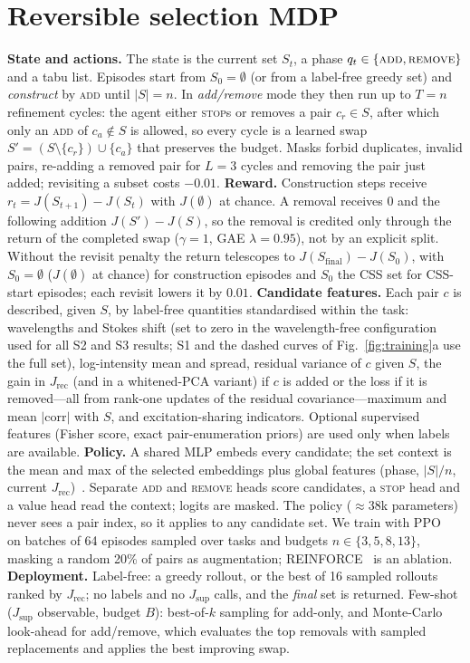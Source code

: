\documentclass[conference]{IEEEtran}
\newcommand{\JS}{J_{\mathrm{sup}}}
\newcommand{\JR}{J_{\mathrm{rec}}}
\newcommand{\add}{\textsc{add}}
\newcommand{\rem}{\textsc{remove}}
\newcommand{\stp}{\textsc{stop}}
\begin{document}
\section{Reversible selection MDP}
\textbf{State and actions.} The state is the current set $S_t$, a phase $q_t\in\{\add,\rem\}$ and a tabu list. Episodes start from $S_0=\emptyset$ (or from a label-free greedy set) and \emph{construct} by \add{} until $|S|=n$. In \emph{add/remove} mode they then run up to $T=n$ refinement cycles: the agent either \stp{}s or removes a pair $c_r\in S$, after which only an \add{} of $c_a\notin S$ is allowed, so every cycle is a learned swap $S'=(S\setminus\{c_r\})\cup\{c_a\}$ that preserves the budget. Masks forbid duplicates, invalid pairs, re-adding a removed pair for $L=3$ cycles and removing the pair just added; revisiting a subset costs $-0.01$.
\textbf{Reward.} Construction steps receive $r_t=J(S_{t+1})-J(S_t)$ with $J(\emptyset)$ at chance. A removal receives $0$ and the following addition $J(S')-J(S)$, so the removal is credited only through the return of the completed swap ($\gamma=1$, GAE $\lambda=0.95$), not by an explicit split. Without the revisit penalty the return telescopes to $J(S_{\mathrm{final}})-J(S_0)$, with $S_0=\emptyset$ ($J(\emptyset)$ at chance) for construction episodes and $S_0$ the CSS set for CSS-start episodes; each revisit lowers it by $0.01$.
\textbf{Candidate features.} Each pair $c$ is described, given $S$, by label-free quantities standardised within the task: wavelengths and Stokes shift (set to zero in the wavelength-free configuration used for all S2 and S3 results; S1 and the dashed curves of Fig.~\ref{fig:training}a use the full set), log-intensity mean and spread, residual variance of $c$ given $S$, the gain in $\JR$ (and in a whitened-PCA variant) if $c$ is added or the loss if it is removed---all from rank-one updates of the residual covariance---maximum and mean $|\mathrm{corr}|$ with $S$, and excitation-sharing indicators. Optional supervised features (Fisher score, exact pair-enumeration priors) are used only when labels are available.
\textbf{Policy.} A shared MLP embeds every candidate; the set context is the mean and max of the selected embeddings plus global features (phase, $|S|/n$, current $\JR$)~\cite{zaheer2017deepsets}. Separate \add{} and \rem{} heads score candidates, a \stp{} head and a value head read the context; logits are masked. The policy ($\approx$38k parameters) never sees a pair index, so it applies to any candidate set. We train with PPO~\cite{schulman2017ppo} on batches of 64 episodes sampled over tasks and budgets $n\in\{3,5,8,13\}$, masking a random 20\% of pairs as augmentation; REINFORCE~\cite{williams1992} is an ablation.
\textbf{Deployment.} Label-free: a greedy rollout, or the best of 16 sampled rollouts ranked by $\JR$; no labels and no $\JS$ calls, and the \emph{final} set is returned. Few-shot ($\JS$ observable, budget $B$): best-of-$k$ sampling for add-only, and Monte-Carlo look-ahead for add/remove, which evaluates the top removals with sampled replacements and applies the best improving swap.
\end{document}
